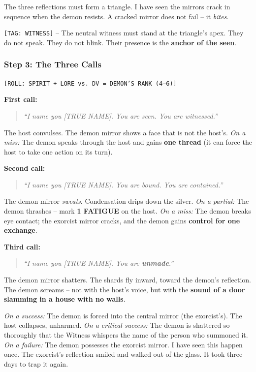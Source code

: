 The three reflections must form a triangle. I have seen the mirrors crack in sequence when the demon resists. A cracked mirror does not fail -- it \emph{bites}.

\texttt{[TAG: WITNESS]} -- The neutral witness must stand at the triangle's apex. They do not speak. They do not blink. Their presence is the \textbf{anchor of the seen}.

\subsubsection{Step 3: The Three Calls} \hfill \texttt{[ROLL: SPIRIT + LORE vs. DV = DEMON'S RANK (4--6)]}

\textbf{First call:}
\begin{quote}\itshape
``I name you [TRUE NAME]. You are seen. You are witnessed.''
\end{quote}
The host convulses. The demon mirror shows a face that is not the host's.  
\emph{On a miss:} The demon speaks through the host and gains \textbf{one thread} (it can force the host to take one action on its turn).

\textbf{Second call:}
\begin{quote}\itshape
``I name you [TRUE NAME]. You are bound. You are contained.''
\end{quote}
The demon mirror \emph{sweats}. Condensation drips down the silver.  
\emph{On a partial:} The demon thrashes -- mark \textbf{1 FATIGUE} on the host.  
\emph{On a miss:} The demon breaks eye contact; the exorcist mirror cracks, and the demon gains \textbf{control for one exchange}.

\textbf{Third call:}
\begin{quote}\itshape
``I name you [TRUE NAME]. You are \textbf{unmade}.''
\end{quote}
The demon mirror shatters. The shards fly inward, toward the demon's reflection. The demon screams -- not with the host's voice, but with the \textbf{sound of a door slamming in a house with no walls}.  

\emph{On a success:} The demon is forced into the central mirror (the exorcist's). The host collapses, unharmed.  
\emph{On a critical success:} The demon is shattered so thoroughly that the Witness whispers the name of the person who summoned it.  
\emph{On a failure:} The demon possesses the exorcist mirror. I have seen this happen once. The exorcist's reflection smiled and walked out of the glass. It took three days to trap it again.

